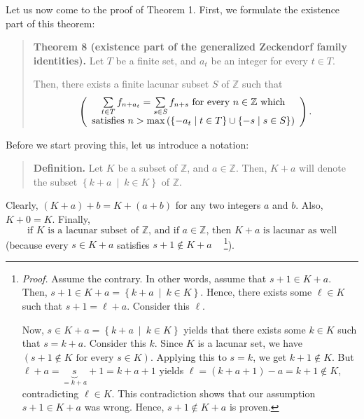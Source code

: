 \documentclass[numbers=enddot,12pt,final,onecolumn,notitlepage]{scrartcl}%
\numberwithin{exer}{section}
\theoremstyle{definition}
\let\sumnonlimits\sum
\renewcommand{\sum}{\sumnonlimits\limits}
\begin{document}
Let us now come to the proof of Theorem 1. First, we formulate the existence
part of this theorem:

\begin{quote}
\textbf{Theorem 8 (existence part of the generalized Zeckendorf family
identities).} Let $T$ be a finite set, and $a_{t}$ be an integer for every
$t\in T$.

Then, there exists a finite lacunar subset $S$ of $\mathbb{Z}$ such that
\[
\left(
\begin{array}
[c]{c}%
\sum\limits_{t\in T}f_{n+a_{t}}=\sum\limits_{s\in S}f_{n+s}\text{ for every
}n\in\mathbb{Z}\text{ which}\\
\text{satisfies }n>\max\left(  \left\{  -a_{t}\mid t\in T\right\}
\cup\left\{  -s\mid s\in S\right\}  \right)
\end{array}
\right)  .
\]

\end{quote}

Before we start proving this, let us introduce a notation:

\begin{quote}
\textbf{Definition.} Let $K$ be a subset of $\mathbb{Z}$, and $a\in\mathbb{Z}%
$. Then, $K+a$ will denote the subset $\left\{  k+a\ \mid\ k\in K\right\}  $
of $\mathbb{Z}$.
\end{quote}

Clearly, $\left(  K+a\right)  +b=K+\left(  a+b\right)  $ for any two integers
$a$ and $b$. Also, $K+0=K$. Finally,%
\begin{equation}
\text{if }K\text{ is a lacunar subset of }\mathbb{Z}\text{, and if }%
a\in\mathbb{Z}\text{, then }K+a\text{ is lacunar as well} \label{lacunar-plus}%
\end{equation}
(because every $s\in K+a$ satisfies $s+1\notin K+a\ \ \ \ $%
\footnote{\textit{Proof.} Assume the contrary. In other words, assume that
$s+1\in K+a$. Then, $s+1\in K+a=\left\{  k+a\ \mid\ k\in K\right\}  $. Hence,
there exists some $\ell\in K$ such that $s+1=\ell+a$. Consider this $\ell$.
\par
Now, $s\in K+a=\left\{  k+a\ \mid\ k\in K\right\}  $ yields that there exists
some $k\in K$ such that $s=k+a$. Consider this $k$. Since $K$ is a lacunar
set, we have $\left(  s+1\notin K\text{ for every }s\in K\right)  $. Applying
this to $s=k$, we get $k+1\notin K$. But $\ell+a=\underbrace{s}_{=k+a}%
+1=k+a+1$ yields $\ell=\left(  k+a+1\right)  -a=k+1\notin K$, contradicting
$\ell\in K$. This contradiction shows that our assumption $s+1\in K+a$ was
wrong. Hence, $s+1\notin K+a$ is proven.}).
\end{document}
